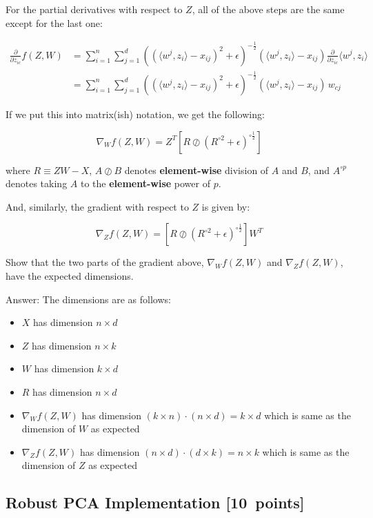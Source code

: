 \documentclass{article}
\newcommand{\blu}[1]{{\textcolor{blu}{#1}}}
\newenvironment{answer}{\par\begingroup\color{gre}Answer: }{\endgroup}
\let\ask\blu
\newcommand\pts[1]{\textcolor{pointscolour}{[#1~points]}}
\begin{document}
For the partial derivatives with respect to $Z$, all of the above steps are the same except for the last one:

\begin{align*}
\frac{\partial}{\partial z_{ic}} f(Z,W)  &= \sum_{i=1}^n\sum_{j=1}^d  \left( (\langle w^j, z_i\rangle - x_{ij})^2 + \epsilon \right)^{-\frac12}   (\langle w^j, z_i\rangle - x_{ij})  \frac{\partial}{\partial z_{ic}} \langle w^j, z_i\rangle \\
  &= \sum_{i=1}^n\sum_{j=1}^d  \left( (\langle w^j, z_i\rangle - x_{ij})^2 + \epsilon \right)^{-\frac12}  (\langle w^j, z_i\rangle - x_{ij}) \, w_{cj}
\end{align*}

If we put this into matrix(ish) notation, we get the following:

\[
\nabla_W f(Z,W) = Z^T \left[ R \oslash \left(R^{\circ 2} + \epsilon\right)^{\circ \frac12}  \right]
\]

where $R\equiv ZW-X$, $A \oslash B$ denotes \textbf{element-wise} division of $A$ and $B$, and $A^{\circ p}$ denotes taking $A$ to the \textbf{element-wise} power of $p$.

And, similarly, the gradient with respect to $Z$ is given by:

\[
\nabla_Z f(Z,W) = \left[ R \oslash \left(R^{\circ 2} + \epsilon\right)^{\circ \frac12} \right] W^T
\]

\ask{Show that the two parts of the gradient above, $\nabla_W f(Z,W)$ and $\nabla_Z f(Z,W)$, have the expected dimensions.}
\begin{answer}
    The dimensions are as follows:
    \begin{itemize}
        \item $X$ has dimension $n\times d$
        \item $Z$ has dimension $n\times k$
        \item $W$ has dimension $k\times d$
        \item $R$ has dimension $n\times d$
        \item $\nabla_W f(Z,W)$ has dimension $(k\times n)\cdot(n\times d) = k\times d$ which is same as the dimension of $W$ as expected
        \item $\nabla_Z f(Z,W)$ has dimension $(n\times d)\cdot(d\times k) = n\times k$ which is same as the dimension of $Z$ as expected
    \end{itemize}
\end{answer}


\subsection{Robust PCA Implementation \pts{10}}
\end{document}
